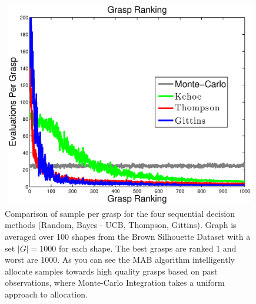 \documentclass[journal,transmag]{IEEEtran}%
\begin{document}
\begin{figure}[ht!]
\centering
\includegraphics[width = 16.5cm, height = 9cm]{matlab_figures/pulls_per_grasp.eps}
\caption{ \footnotesize Comparison of sample per grasp for the four sequential decision methods (Random, Bayes - UCB, Thompson, Gittins). Graph is averaged over 100 shapes from the Brown Silhouette Dataset \cite{brown} with a set $|G|=1000$ for each shape. The best grasps are ranked 1 and worst are 1000. As you can see the MAB algorithm intelligently allocate samples towards high quality grasps based on past observations, where Monte-Carlo Integration takes a uniform approach to allocation. }

\vspace*{-10pt}
\label{fig:pulls_per_grasp}
\end{figure}
\end{document}

